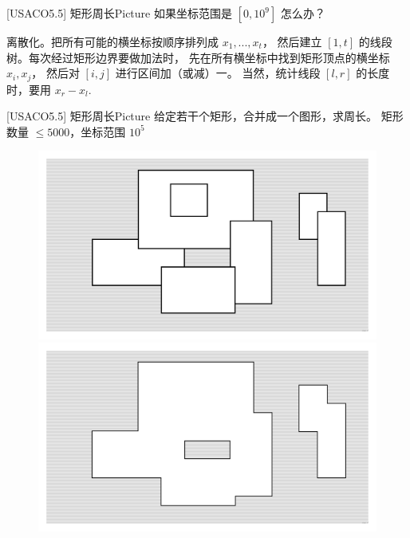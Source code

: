 \documentclass{beamer}
\begin{document}
\begin{frame}{[USACO5.5] 矩形周长Picture}
    \small
    如果坐标范围是 $[0,10^9]$ 怎么办？

    \vspace{1em}\pause
    离散化。把所有可能的横坐标按顺序排列成 $x_1,...,x_t$，
    然后建立 $[1,t]$ 的线段树。每次经过矩形边界要做加法时，
    先在所有横坐标中找到矩形顶点的横坐标 $x_i,x_j$，
    然后对 $[i,j]$ 进行区间加（或减）一。
    当然，统计线段 $[l,r]$ 的长度时，要用 $x_r-x_l$.
\end{frame}

\begin{frame}{[USACO5.5] 矩形周长Picture}
    \small
    给定若干个矩形，合并成一个图形，求周长。
    矩形数量 $\leq 5000$，坐标范围 $10^5$
    \begin{figure}[H]
        \begin{minipage}[t]{0.49\textwidth}
            \centering
            \includegraphics[width=\textwidth]{pic/picture-1.png}
        \end{minipage}
        \begin{minipage}[t]{0.49\textwidth}
            \centering
            \includegraphics[width=\textwidth]{pic/picture-2.png}
        \end{minipage}
    \end{figure}
\end{frame}
\end{document}
